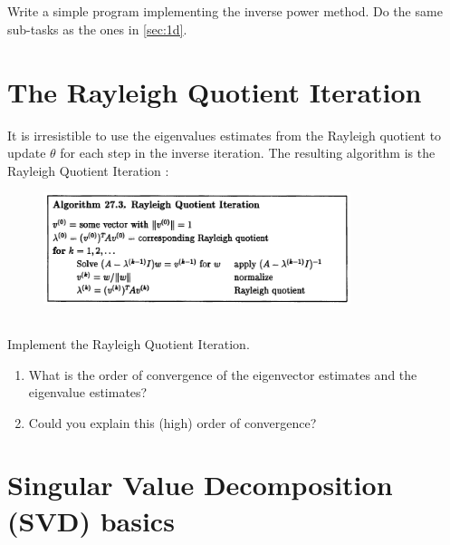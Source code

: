 \documentclass[11pt,letterpaper]{report}
\begin{document}
\subsection{}
Write a simple program implementing the inverse power method. Do the same sub-tasks as the ones in \ref{sec:1d}.

\section{The Rayleigh Quotient Iteration}
It is irresistible to use the eigenvalues estimates from the Rayleigh quotient to update $\theta$ for each step in the inverse iteration. The resulting algorithm is the Rayleigh Quotient Iteration \cite{TrefethenBau_97}:
\begin{figure}[H]
    \centering
    \includegraphics[width = 0.8\textwidth]{Session_9/latex/figs/TB_Rayleigh_Quo_Iter}
\end{figure}

\subsection{}
Implement the Rayleigh Quotient Iteration. 
\begin{enumerate}
    \item What is the order of convergence of the eigenvector estimates and the eigenvalue estimates?
    \item Could you explain this (high) order of convergence?
\end{enumerate}

\section{Singular Value Decomposition (SVD) basics}
\end{document}
